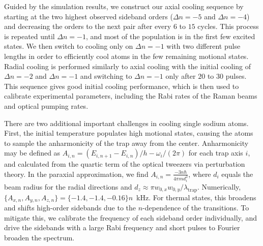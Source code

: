 \documentclass[aps,prl,twocolumn,groupedaddress]{revtex4-1}
\begin{document}
Guided by the simulation results,
we construct our axial cooling sequence by starting at the two highest
observed sideband orders ($\Delta n=-5$ and $\Delta n=-4$)
and decreasing the orders to the next pair after every $6$ to $15$ cycles.
This process is repeated until $\Delta n=-1$,
and most of the population is in the first few excited states.
We then switch to cooling only on $\Delta n=-1$ with two different pulse lengths
in order to efficiently cool atoms in the few remaining motional states.
Radial cooling is performed similarly to axial cooling with the initial cooling
of $\Delta n=-2$ and $\Delta n=-1$ and switching to $\Delta n=-1$ only after $20$ to $30$ pulses.
This sequence gives good initial cooling performance, which is then used to calibrate experimental
parameters, including the Rabi rates of the Raman beams and optical pumping rates.

There are two additional important challenges in cooling single sodium atoms.
First, the initial temperature populates high motional states,
causing the atoms to sample the anharmonicity of the trap away from the center.
Anharmonicity may be defined as $A_{i,n}=(E_{i,n+1}-E_{i,n})/h - \omega_i/(2\pi)$
for each trap axis $i$, and calculated from the quartic term
of the optical tweezers via perturbation theory.
In the paraxial approximation, we find $A_{i,n}=\frac{-3n\hbar}{4\pi m d_i^2}$,
where $d_i$ equals the beam radius for the radial directions and
$d_z\approx\pi w_{0,x}w_{0,y}/\lambda_{\textrm{trap}}$.
Numerically, $\{A_{x,n},A_{y,n},A_{z,n}\}=\{-1.4, -1.4, -0.16\}n$~kHz.
For thermal states, this broadens and shifts high-order sidebands due to the $n$-dependence of the transitions. To mitigate this, we calibrate the frequency of each sideband order individually, and drive the sidebands with a large Rabi frequency and short pulses to Fourier broaden the spectrum.
\end{document}
